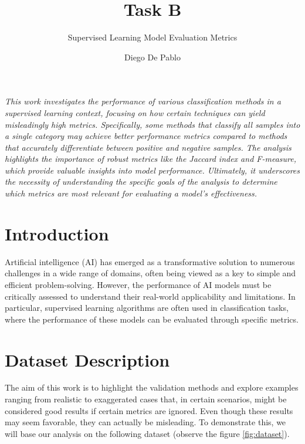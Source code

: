 \documentclass{llncs}
\begin{document}
\title{Task B}
\subtitle{Supervised Learning Model Evaluation Metrics}

\author{Diego De Pablo}

\maketitle 

\vspace{1cm} %

\textit{
	This work investigates the performance of various classification methods in a supervised learning context, focusing on how certain techniques can yield misleadingly high metrics. Specifically, some methods that classify all samples into a single category may achieve better performance metrics compared to methods that accurately differentiate between positive and negative samples. The analysis highlights the importance of robust metrics like the Jaccard index and F-measure, which provide valuable insights into model performance. Ultimately, it underscores the necessity of understanding the specific goals of the analysis to determine which metrics are most relevant for evaluating a model’s effectiveness. }



\section{Introduction}

Artificial intelligence (AI) has emerged as a transformative solution to numerous challenges in a wide range of domains, often being viewed as a key to simple and efficient problem-solving. However, the performance of AI models must be critically assessed to understand their real-world applicability and limitations. In particular, supervised learning algorithms are often used in classification tasks, where the performance of these models can be evaluated through specific metrics.


\section{Dataset Description}

The aim of this work is to highlight the validation methods and explore examples ranging from realistic to exaggerated cases that, in certain scenarios, might be considered good results if certain metrics are ignored. Even though these results may seem favorable, they can actually be misleading. To demonstrate this, we will base our analysis on the following dataset (observe the figure \ref{fig:dataset}).
\end{document}
